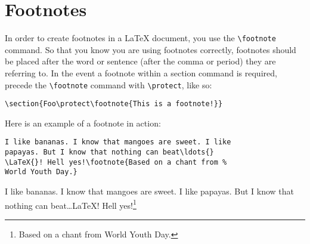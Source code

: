 \section{Footnotes}
\label{sec:footnotes}

In order to create footnotes in a \LaTeX{} document, you use the
\verb=\footnote= command.  So that you know you are using
footnotes correctly, footnotes should be placed after the word or
sentence (after the comma or period) they are referring to. In the
event a footnote within a section command is required, precede the
\verb|\footnote| command with \verb|\protect|, like so:
\begin{verbatim}
\section{Foo\protect\footnote{This is a footnote!}}
\end{verbatim}
Here is an example of a footnote in action:
\begin{verbatim}
I like bananas. I know that mangoes are sweet. I like
papayas. But I know that nothing can beat\ldots{}
\LaTeX{}! Hell yes!\footnote{Based on a chant from %
World Youth Day.}
\end{verbatim}
I like bananas. I know that mangoes are sweet. I like papayas. But I
know that nothing can beat\ldots{}\LaTeX{}!  Hell yes!\footnote{Based on a
  chant from World Youth Day.}


